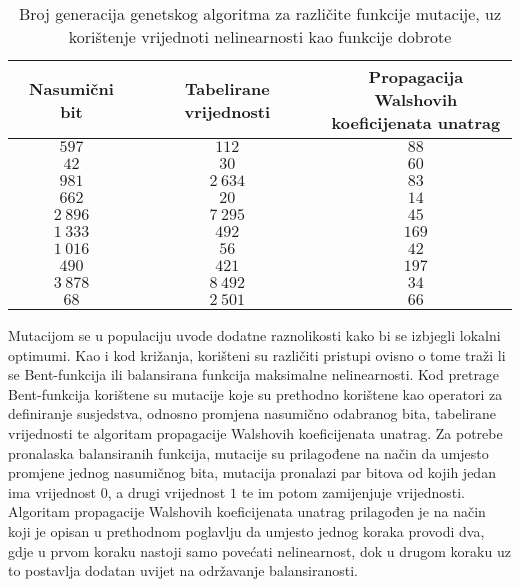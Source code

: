 \begin{table}[]
    \centering
    \begin{tabular}{ccc}
        Nasumični bit & Tabelirane vrijednosti & \makecell{Propagacija Walshovih \\ koeficijenata unatrag} \\ \hline
           $597$ &    $112$ &  $88$ \\
            $42$ &     $30$ &  $60$ \\
           $981$ & $2\:634$ &  $83$ \\
           $662$ &     $20$ &  $14$ \\
        $2\:896$ & $7\:295$ &  $45$ \\
        $1\:333$ &    $492$ & $169$ \\
        $1\:016$ &     $56$ &  $42$ \\
           $490$ &    $421$ & $197$ \\
        $3\:878$ & $8\:492$ &  $34$ \\
            $68$ & $2\:501$ &  $66$
    \end{tabular}
    \captionsetup{justification=centering}
    \caption{Broj generacija genetskog algoritma za različite funkcije mutacije, uz korištenje vrijednoti nelinearnosti kao funkcije dobrote}
    \label{tbl:ga_6_nonl}
\end{table}

Mutacijom se u populaciju uvode dodatne raznolikosti kako bi se izbjegli lokalni optimumi.
Kao i kod križanja, korišteni su različiti pristupi ovisno o tome traži li se Bent-funkcija ili balansirana funkcija maksimalne nelinearnosti.
Kod pretrage Bent-funkcija korištene su mutacije koje su prethodno korištene kao operatori za definiranje susjedstva, odnosno promjena nasumično odabranog bita, tabelirane vrijednosti te algoritam propagacije Walshovih koeficijenata unatrag.
Za potrebe pronalaska balansiranih funkcija, mutacije su prilagođene na način da umjesto promjene jednog nasumičnog bita, mutacija pronalazi par bitova od kojih jedan ima vrijednost $0$, a drugi vrijednost $1$ te im potom zamijenjuje vrijednosti.
Algoritam propagacije Walshovih koeficijenata unatrag prilagođen je na način koji je opisan u prethodnom poglavlju da umjesto jednog koraka provodi dva, gdje u prvom koraku nastoji samo povećati nelinearnost, dok u drugom koraku uz to postavlja dodatan uvijet na održavanje balansiranosti.

